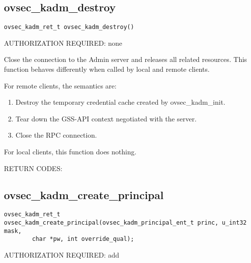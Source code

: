 \subsection{ovsec_kadm_destroy}

\begin{verbatim}
ovsec_kadm_ret_t ovsec_kadm_destroy()
\end{verbatim}

AUTHORIZATION REQUIRED: none

Close the connection to the Admin server and releases all related
resources.  This function behaves differently when called by local and
remote clients.

For remote clients, the semantics are:

\begin{enumerate}
\item Destroy the temporary credential cache created by
ovsec_kadm_init.

\item Tear down the GSS-API context negotiated with the server.

\item Close the RPC connection.
\end{enumerate}

For local clients, this function does nothing.

RETURN CODES:

\subsection{ovsec_kadm_create_principal}

\begin{verbatim}
ovsec_kadm_ret_t
ovsec_kadm_create_principal(ovsec_kadm_principal_ent_t princ, u_int32 mask,
		char *pw, int override_qual);
\end{verbatim}

AUTHORIZATION REQUIRED: add

